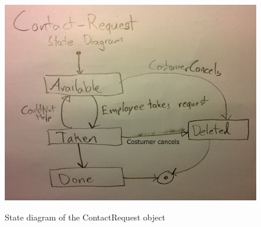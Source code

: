 \begin{figure}[h!]
	\centering
		\includegraphics[scale=0.35]{Figures/StateDiagram-ContactRequest}\\
	\caption{State diagram of the ContactRequest object}
  \label{fig:StateDiagram-ContactRequest}
\end{figure}